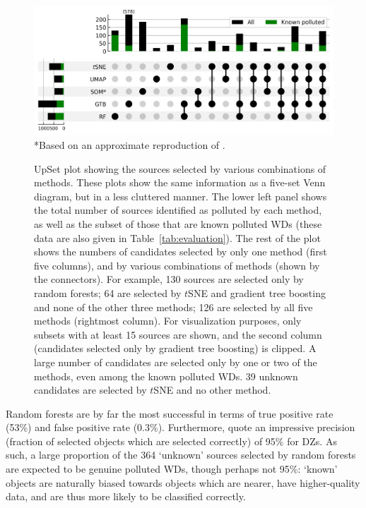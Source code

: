 \documentclass[fleqn,usenatbib]{rasti}
\begin{document}
\begin{figure}
\centering
\includegraphics[width=\textwidth]{figures/fig7_upset.png}
*Based on an approximate reproduction of \citet{perezcouto24}.
\caption{
    UpSet plot \citep{lex14} showing the sources selected by various combinations of methods.
    These plots show the same information as a five-set Venn diagram, but in a less cluttered manner.
    The lower left panel shows the total number of sources identified as polluted by each method, as well as the subset of those that are known polluted WDs (these data are also given in Table~\ref{tab:evaluation}).
    The rest of the plot shows the numbers of candidates selected by only one method (first five columns), and by various combinations of methods (shown by the connectors).
    For example, 130 sources are selected only by random forests; 64 are selected by $t$SNE and gradient tree boosting and none of the other three methods; 126 are selected by all five methods (rightmost column).
    For visualization purposes, only subsets with at least 15 sources are shown, and the second column (candidates selected only by gradient tree boosting) is clipped.
    A large number of candidates are selected only by one or two of the methods, even among the known polluted WDs.
    39 unknown candidates are selected by $t$SNE and no other method.
}
\label{fig:overlap}
\end{figure}

Random forests are by far the most successful in terms of true positive rate (53\%) and false positive rate (0.3\%).
Furthermore, \citet{garciazamora25} quote an impressive precision (fraction of selected objects which are selected correctly) of 95\% for DZs.
As such, a large proportion of the 364 `unknown' sources selected by random forests are expected to be genuine polluted WDs, though perhaps not 95\%: `known' objects are naturally biased towards objects which are nearer, have higher-quality data, and are thus more likely to be classified correctly.
\end{document}
